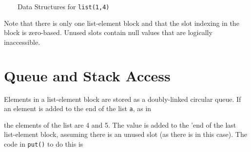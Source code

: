 \ \ \ \ Data Structures for \texttt{list(1,4)}

Note that there is only one list-element block and that the slot
indexing in the block is zero-based. Unused slots contain null values
that are logically inaccessible.

\section{Queue and Stack Access}

Elements in a list-element block are stored as a doubly-linked
circular queue. If an element is added to the end of the list
\texttt{a}, as in


\noindent the elements of the list are 4 and 5. The value is added to
the '{\textquotedbl}end{\textquotedbl} of the last list-element block,
assuming there is an unused slot (as there is in this case). The code
in \texttt{put()} to do this is

